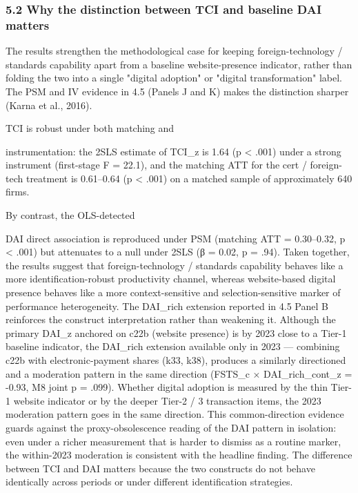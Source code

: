 \documentclass[12pt,a4paper]{article}
\begin{document}
\hypertarget{52-why-the-distinction-between-tci-and-baseline-dai-matters}{%
\subsubsection{5.2 Why the distinction between TCI and baseline DAI
matters}\label{52-why-the-distinction-between-tci-and-baseline-dai-matters}}

The results strengthen the methodological case for keeping
foreign-technology / standards capability apart from a baseline
website-presence indicator, rather than folding the two into a single
"digital adoption" or "digital transformation" label. The PSM and IV
evidence in 4.5 (Panels J and K) makes the distinction sharper (Karna et
al., 2016).

TCI is robust under both matching and

instrumentation: the 2SLS estimate of TCI\_z is 1.64 (p \textless{}
.001) under a strong instrument (first-stage F = 22.1), and the matching
ATT for the cert / foreign-tech treatment is 0.61--0.64 (p \textless{}
.001) on a matched sample of approximately 640 firms.

By contrast, the OLS-detected

DAI direct association is reproduced under PSM (matching ATT =
0.30--0.32, p \textless{} .001) but attenuates to a null under 2SLS (β =
0.02, p = .94). Taken together, the results suggest that
foreign-technology / standards capability behaves like a more
identification-robust productivity channel, whereas website-based
digital presence behaves like a more context-sensitive and
selection-sensitive marker of performance heterogeneity. The DAI\_rich
extension reported in 4.5 Panel B reinforces the construct
interpretation rather than weakening it. Although the primary DAI\_z
anchored on c22b (website presence) is by 2023 close to a Tier-1
baseline indicator, the DAI\_rich extension available only in 2023 ---
combining c22b with electronic-payment shares (k33, k38), produces a
similarly directioned and a moderation pattern in the same direction
(FSTS\_c × DAI\_rich\_cont\_z = -0.93, M8 joint p = .099). Whether
digital adoption is measured by the thin Tier-1 website indicator or by
the deeper Tier-2 / 3 transaction items, the 2023 moderation pattern
goes in the same direction. This common-direction evidence guards
against the proxy-obsolescence reading of the DAI pattern in isolation:
even under a richer measurement that is harder to dismiss as a routine
marker, the within-2023 moderation is consistent with the headline
finding. The difference between TCI and DAI matters because the two
constructs do not behave identically across periods or under different
identification strategies.
\end{document}

